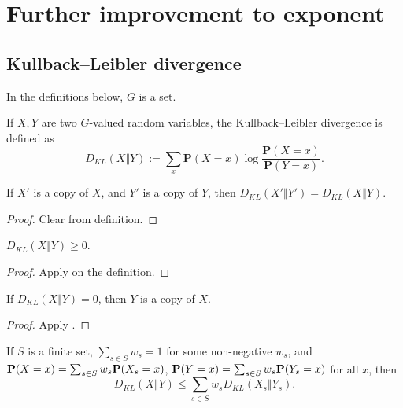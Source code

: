 \chapter{Further improvement to exponent}

\section{Kullback--Leibler divergence}

In the definitions below, $G$ is a set.

\begin{definition}\label{kl-div}\leanok If $X,Y$ are two $G$-valued random variables, the Kullback--Leibler divergence is defined as
  $$ D_{KL}(X\Vert Y) := \sum_x \mathbf{P}(X=x) \log \frac{\mathbf{P}(X=x)}{\mathbf{P}(Y=x)}.$$
\end{definition}

\begin{lemma}\label{kl-div-copy}\leanok  If $X'$ is a copy of $X$, and $Y'$ is a copy of $Y$, then $D_{KL}(X'\Vert Y') = D_{KL}(X\Vert Y)$.
\end{lemma}

\begin{proof}\leanok  Clear from definition.
\end{proof}

\begin{lemma}\label{Gibbs}\leanok  $D_{KL}(X\Vert Y) \geq 0$.
\end{lemma}

\begin{proof}\leanok
  Apply  on the definition.
\end{proof}

\begin{lemma}\label{Gibbs-converse}\leanok  If $D_{KL}(X\Vert Y) = 0$, then $Y$ is a copy of $X$.
\end{lemma}

\begin{proof}\leanok
  Apply .
\end{proof}

\begin{lemma}\label{kl-div-convex}\leanok  If $S$ is a finite set, $\sum_{s \in S} w_s = 1$ for some non-negative $w_s$, and ${\bf P}(X=x) = \sum_{s\in S} w_s  {\bf P}(X_s=x)$, ${\bf P}(Y=x) = \sum_{s\in S} w_s  {\bf P}(Y_s=x)$ for all $x$, then
$$D_{KL}(X\Vert Y) \le \sum_{s\in S} w_s D_{KL}(X_s\Vert Y_s).$$
\end{lemma}

